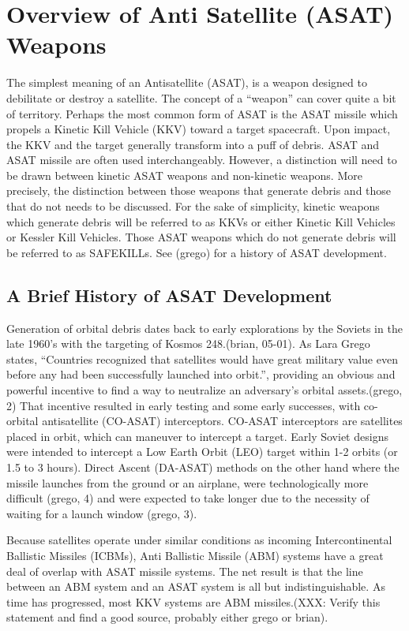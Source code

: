 \section{Overview of Anti Satellite (ASAT) Weapons}

The simplest meaning of an Antisatellite (ASAT), is a weapon designed
to debilitate or destroy a satellite.  The concept of a ``weapon'' can
cover quite a bit of territory.  Perhaps the most common form of ASAT
is the ASAT missile which propels a Kinetic Kill Vehicle (KKV) toward
a target spacecraft.  Upon impact, the KKV and the target generally
transform into a puff of debris.  ASAT and ASAT missile are often used
interchangeably.  However, a distinction will need to be drawn between
kinetic ASAT weapons and non-kinetic weapons.  More precisely, the
distinction between those weapons that generate debris and those that
do not needs to be discussed.  For the sake of simplicity, kinetic
weapons which generate debris will be referred to as KKVs or either
Kinetic Kill Vehicles or Kessler Kill Vehicles.  Those ASAT weapons
which do not generate debris will be referred to as SAFEKILLs.  See
(grego) for a history of ASAT development.

\subsection{A Brief History of ASAT Development}

Generation of orbital debris dates back to early explorations by the
Soviets in the late 1960's with the targeting of Kosmos 248.(brian,
05-01).  As Lara Grego states, ``Countries recognized that satellites
would have great military value even before any had been successfully
launched into orbit.'', providing an obvious and powerful incentive to
find a way to neutralize an adversary's orbital assets.(grego, 2) That
incentive resulted in early testing and some early successes, with
co-orbital antisatellite (CO-ASAT) interceptors.  CO-ASAT interceptors
are satellites placed in orbit, which can maneuver to intercept a
target.  Early Soviet designs were intended to intercept a Low Earth
Orbit (LEO) target within 1-2 orbits (or 1.5 to 3 hours).  Direct
Ascent (DA-ASAT) methods on the other hand where the missile launches
from the ground or an airplane, were technologically more difficult
(grego, 4) and were expected to take longer due to the necessity of
waiting for a launch window (grego, 3).

Because satellites operate under similar conditions as incoming
Intercontinental Ballistic Missiles (ICBMs), Anti Ballistic Missile
(ABM) systems have a great deal of overlap with ASAT missile systems.
The net result is that the line between an ABM system and an ASAT
system is all but indistinguishable.  As time has progressed, most KKV
systems are ABM missiles.(XXX: Verify this statement and find a good
source, probably either grego or brian).

